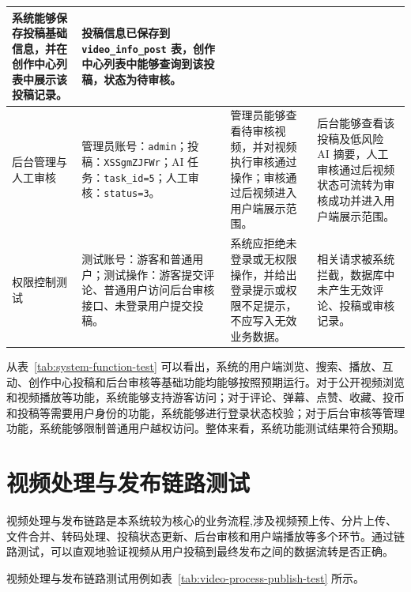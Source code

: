 \begin{table}[!htbp]
\begin{tabular}{p{}p{}p{}p{}}
		系统能够保存投稿基础信息，并在创作中心列表中展示该投稿记录。 &
		投稿信息已保存到 \texttt{video\_info\_post} 表，创作中心列表中能够查询到该投稿，状态为待审核。 \\
		\hline
		后台管理与人工审核 &
		管理员账号：\texttt{admin}；投稿：\texttt{XSSgmZJFWr}；AI 任务：\texttt{task\_id=5}；人工审核：\texttt{status=3}。 &
		管理员能够查看待审核视频，并对视频执行审核通过操作；审核通过后视频进入用户端展示范围。 &
		后台能够查看该投稿及低风险 AI 摘要，人工审核通过后视频状态可流转为审核成功并进入用户端展示范围。 \\
		\hline
		权限控制测试 &
		测试账号：游客和普通用户；测试操作：游客提交评论、普通用户访问后台审核接口、未登录用户提交投稿。 &
		系统应拒绝未登录或无权限操作，并给出登录提示或权限不足提示，不应写入无效业务数据。 &
		相关请求被系统拦截，数据库中未产生无效评论、投稿或审核记录。 \\
		\hline
	\end{tabular}
\end{table}

\FloatBarrier

从表~\ref{tab:system-function-test} 可以看出，系统的用户端浏览、搜索、播放、互动、创作中心投稿和后台审核等基础功能均能够按照预期运行。对于公开视频浏览和视频播放等功能，系统能够支持游客访问；对于评论、弹幕、点赞、收藏、投币和投稿等需要用户身份的功能，系统能够进行登录状态校验；对于后台审核等管理功能，系统能够限制普通用户越权访问。整体来看，系统功能测试结果符合预期。

\section{视频处理与发布链路测试}
\label{sec:video-process-publish-test}

视频处理与发布链路是本系统较为核心的业务流程,涉及视频预上传、分片上传、文件合并、转码处理、投稿状态更新、后台审核和用户端播放等多个环节。通过链路测试，可以直观地验证视频从用户投稿到最终发布之间的数据流转是否正确。

视频处理与发布链路测试用例如表~\ref{tab:video-process-publish-test} 所示。

